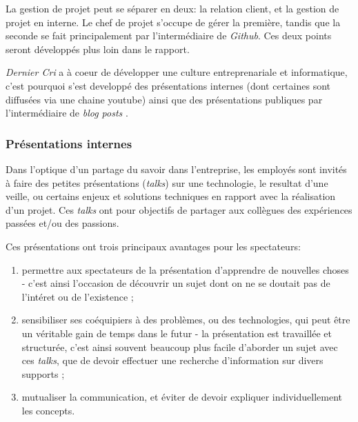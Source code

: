 \documentclass[12pt,a4paper]{article}
\providecommand{\tightlist}{%
  \setlength{\itemsep}{0pt}\setlength{\parskip}{0pt}}
\begin{document}
  \bigskip

  La gestion de projet peut se séparer en deux: la relation client, et la
  gestion de projet en interne. Le chef de projet s'occupe de gérer la
  première, tandis que la seconde se fait principalement par
  l'intermédiaire de \emph{Github}. Ces deux points seront développés plus
  loin dans le rapport.

  \bigskip

  \emph{Dernier Cri} a à coeur de développer une culture entreprenariale
  et informatique, c'est pourquoi s'est developpé des présentations
  internes (dont certaines sont diffusées via une chaine youtube) ainsi
  que des présentations publiques par l'intermédiaire de \emph{blog posts}
  .

  \subsubsection{Présentations internes}\label{pruxe9sentations-internes}

  \bigskip

  Dans l'optique d'un partage du savoir dans l'entreprise, les employés
  sont invités à faire des petites présentations (\emph{talks}) sur une
  technologie, le resultat d'une veille, ou certains enjeux et solutions
  techniques en rapport avec la réalisation d'un projet. Ces \emph{talks}
  ont pour objectifs de partager aux collègues des expériences passées
  et/ou des passions.

  \bigskip

  Ces présentations ont trois principaux avantages pour les spectateurs:

  \begin{enumerate}
  \def\labelenumi{\arabic{enumi}.}
  \tightlist
  \item
    permettre aux spectateurs de la présentation d'apprendre de nouvelles
    choses - c'est ainsi l'occasion de découvrir un sujet dont on ne se
    doutait pas de l'intéret ou de l'existence ;\\
  \item
    sensibiliser ses coéquipiers à des problèmes, ou des technologies, qui
    peut être un véritable gain de temps dans le futur - la présentation
    est travaillée et structurée, c'est ainsi souvent beaucoup plus facile
    d'aborder un sujet avec ces \emph{talks}, que de devoir effectuer une
    recherche d'information sur divers supports ;\\
  \item
    mutualiser la communication, et éviter de devoir expliquer
    individuellement les concepts.
  \end{enumerate}
\end{document}
